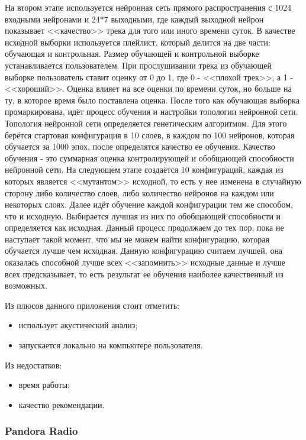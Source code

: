 На втором этапе используется нейронная сеть прямого распространения с 1024 входными нейронами и 24*7 выходными, где каждый выходной нейрон показывает <<качество>> трека для того или иного времени суток.  В качестве исходной выборки используется плейлист, который делится на две части: обучающая и контрольная. Размер обучающей и контрольной выборке устанавливается пользователем. При прослушивании трека из обучающей выборке пользователь ставит оценку от 0 до 1, где 0 - <<плохой трек>>, а 1 - <<хороший>>. Оценка влияет на все оценки по времени суток, но больше на ту, в которое время было поставлена оценка.  После того как обучающая выборка промаркирована, идёт процесс обучения и настройки топологии нейронной сети. Топология нейронной сети  определяется генетическим алгоритмом. Для этого берётся стартовая конфигурация в 10 слоев, в каждом по 100 нейронов, которая обучается за 1000 эпох, после определятся качество ее обучения. Качество обучения - это суммарная оценка контролирующей и обобщающей способности нейронной сети. На следующем этапе создаётся 10 конфигураций, каждая из которых является <<мутантом>> исходной, то есть у нее изменена в случайную сторону либо количество слоев, либо количество нейронов на каждом или некоторых слоях. Далее идёт обучение каждой конфигурации тем же способом, что и исходную. Выбирается лучшая из них по обобщающей способности  и определяется как исходная. Данный процесс продолжаем до тех пор, пока не наступает такой момент, что мы не можем найти конфигурацию, которая обучается лучше чем исходная. Данную конфигурацию считаем лучшей, она оказалась способной лучше всех <<запомнить>> исходные данные и лучше всех предсказывает, то есть результат ее обучения наиболее качественный из возможных.





Из плюсов данного приложения стоит отметить:
\begin{itemize}
\item использует акустический анализ;
\item запускается локально на компьютере пользователя.
\end{itemize}

Из недостатков:
\begin{itemize}
\item время работы;
\item качество рекомендации.
\end{itemize}



\subsubsection {Pandora Radio}

